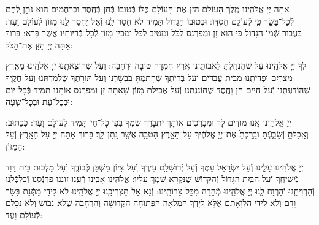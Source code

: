 \documentclass[twoside, openany, parskip=half, 11pt]{book}
\begin{document}
\nextpage
{}
אַתָּה יְיָ אֱלֹהֵֽינוּ מֶֽלֶךְ הָעוֹלָם הַזָּן אֶת־הָעוֹלָם כֻּלּוֹ בְּֿטוּבוֹ בְּֿחֵן בְּֿחֶֽסֶד וּבְרַחֲמִים הוּא נֹתֵ֣ן לֶ֭חֶם לְֿכׇל־בָּשָׂ֑ר כִּ֖י לְֿעוֹלָ֣ם חַסְדּֽוֹ: וּבְטוּבוֹ הַגָּדוֹל תָּמִיד לֹא חָסַר לָֽנוּ וְֿאַל יֶחְסַר לָֽנוּ מָזוֹן לְֿעוֹלָם וָעֶד: בַּעֲבוּר שְֿׁמוֹ הַגָּדוֹל כִּי הוּא זָן וּמְפַרְנֵס לַכֹּל וּמֵטִיב לַכֹּל וּמֵכִין מָזוֹן לְֿכׇל־בְּֿֿרִיּוֹתָיו אֲשֶׁר בָּרָא: בָּרוּךְ אַתָּה יְיָ הַזָּן אֶת־הַכֹּל:



לְּֿךָ יְיָ אֱלֹהֵֽינוּ עַל שֶׁהִנְחַֽלְתָּ לַאֲבוֹתֵֽינוּ אֶֽרֶץ חֶמְדָה טוֹבָה וּרְחָבָה: וְֿעַל שֶׁהוֹצֵאתָֽנוּ יְיָ אֱלֹהֵֽינוּ מֵאֶֽרֶץ מִצְרַֽיִם וּפְדִיתָֽנוּ מִבֵּית עֲבָדִים וְֿעַל בְּֿרִיתְֿךָ שֶׁחָתַֽמְתָּ בִּבְשָׂרֵֽנוּ וְֿעַל תּוֹרָתְֿךָ שֶׁלִּמַּדְתָּֽנוּ וְֿעַל חֻקֶּֽיךָ שֶׁהוֹדַעְתָּֽנוּ וְֿעַל חַיִּים חֵן וָחֶֽסֶד שֶׁחוֹנַנְתָּֽנוּ וְֿעַל אֲכִילַת מָזוֹן שָׁאַתָּה זָן וּמְפַרְנֵס אוֹתָֽנוּ תָּמִיד בְּֿכׇל־יוֹם וּבְכׇל־עֵת וּבְכׇל־שָׁעָה:


\alhanisim

יְיָ אֱלֹהֵֽינוּ אָֽנוּ מוֹדִים לָךְ וּמְבָרְכִים אוֹתָךְ יִתְבָּרַךְ שִׁמְךָ בְּֿפִי כׇל־חַי תָּמִיד לְֿעוֹלָם וָעֶד: כַּכָּתוּב: %
וְאָֽכַלְתָּ֖ וְֿשָׂבָ֑עְֿתָּ וּבֵֽרַכְתָּ֙ אֶת־יְיָ֣ אֱלֹהֶ֔יךָ עַל־הָאָ֥רֶץ הַטֹּבָ֖ה אֲשֶׁ֥ר נָֽתַן־לָֽךְ׃ בָּרוּךְ אַתָּה יְיָ עַל הָאָֽרֶץ וְֿעַל הַמָּזוֹן:



יְיָ אֱלֹהֵֽינוּ עָלֵֽינוּ וְֿעַל יִשְׂרָאֵל עַמֶּךָ וְֿעַל יְֿרוּשָׁלַ‍ִם עִירֶֽךָ וְֿעַל צִיּוֹן מִשְׁכַּן כְּֿבוֹדֶֽךָ וְֿעַל מַלְכוּת בֵּית דָּוִד מְֿשִׁיחֶֽךָ וְֿעַל הַבַּֽיִת הַגָּדוֹל וְֿהַקָּדוֹשׁ שֶׁנִּקְרָא שִׁמְךָ עָלָיו: אֱלֹהֵֽינוּ אָבִֽינוּ רְֿעֵֽנוּ זוּנֵֽנוּ פַרְנְֿסֵֽנוּ וְֿכַלְכְּֿלֵֽנוּ וְֿהַרְוִיחֵֽנוּ וְֿהַרְוַח לָֽנוּ יְיָ אֱלֹהֵֽינוּ מְֿהֵרָה מִכׇּל־צָרוֹתֵֽינוּ: וְֿנָא אַל תַּצְרִיכֵֽנוּ יְיָ אֱלֹהֵֽינוּ לֹא לִידֵי מַתְּֿנַת בָּשָׂר וָדָם וְֿלֹא לִידֵי הַלְוָאָתָם אֶלָּא לְֿיָדְֿךָ הַמְּֿלֵאָה הַפְּֿתוּחָה הַקְּֿדוֹשָׁה וְֿהָרְֿחָבָה שֶׁלֹּא נֵבוֹשׁ וְֿלֹא נִכָּלֵם לְֿעוֹלָם וָעֶד:

\enlargethispage{\baselineskip}
\end{document}
